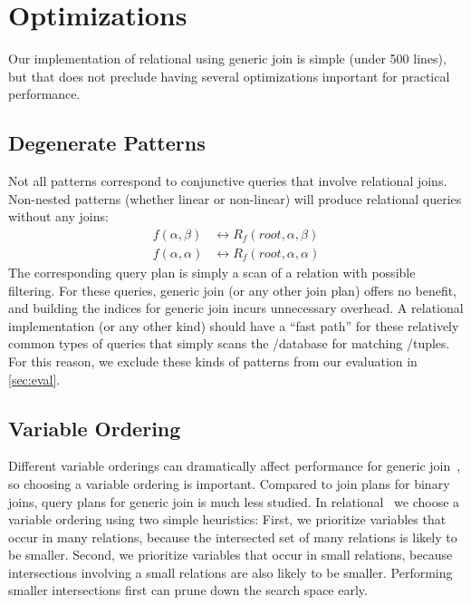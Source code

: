 \section{Optimizations}
\label{sec:optimization}

Our implementation of relational \ematching
 using generic join is simple (under 500 lines),
 but that does not preclude having several optimizations
 important for practical performance.

\subsection{Degenerate Patterns}
\label{sec:degenerate}

Not all patterns correspond to conjunctive queries that involve relational
joins.
Non-nested patterns (whether linear or non-linear) will produce
 relational queries without any joins:
\begin{align*}
  f(\alpha, \beta) &\leftrightarrow R_f(\mathit{root}, \alpha, \beta) \\
  f(\alpha, \alpha) &\leftrightarrow R_f(\mathit{root}, \alpha, \alpha)
\end{align*}
The corresponding query plan is simply a
 scan of a relation with possible filtering.
For these queries,
 generic join (or any other join plan) offers no benefit,
 and building the indices for generic join incurs unnecessary overhead.
A relational \ematching implementation (or any other kind)
 should have a ``fast path''
 for these relatively common types of queries
 that simply scans the \egraph/database for matching \enodes/tuples.
For this reason,
 we exclude these kinds of patterns from our evaluation in \autoref{sec:eval}.

\subsection{Variable Ordering}

Different variable orderings can dramatically affect performance
 for generic join~\cite{eval-wcoj, emptyheaded},
 so choosing a variable ordering is important.
Compared to join plans for binary joins,
 query plans for generic join is much less studied.
In relational \ematching\ we choose a variable ordering
 using two simple heuristics:
First, we prioritize variables that occur in many relations,
 because the intersected set of many relations is likely to be smaller.
Second, we prioritize variables that occur in small relations,
 because intersections involving a small relations are also likely to be smaller.
Performing smaller intersections first can prune down the search space early.

